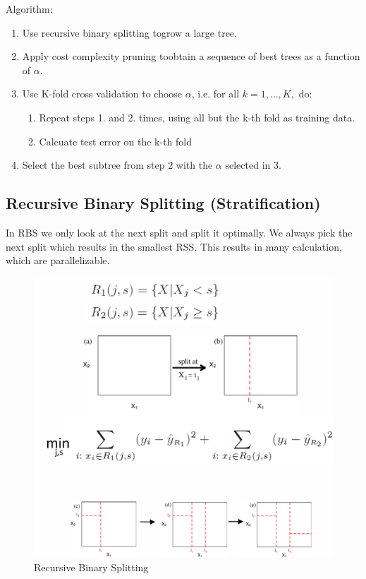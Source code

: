 \documentclass[../Main.tex]{subfiles}
\begin{document}
Algorithm:
\begin{enumerate}
    \item Use recursive binary splitting togrow a large tree.
    \item Apply cost complexity pruning toobtain a sequence of best trees as a function of \(\alpha\).
    \item Use K-fold cross validation to choose \(\alpha\), i.e. for all \(k=1,\dots,K,\) do:
    \begin{enumerate}
        \item Repeat steps 1. and 2. times, using all but the k-th fold as training data.
        \item Calcuate test error on the k-th fold
    \end{enumerate}
    \item Select the best subtree from step 2 with the \(\alpha\) selected in 3.
\end{enumerate}

\subsection{Recursive Binary Splitting (Stratification)}


In RBS we only look at the next split and split it optimally.
We always pick the next split which results in the smallest RSS.
This results in many calculation, which are parallelizable.
\begin{figure}[H]
    \centering
    \includegraphics[width=0.5\linewidth]{Images/recursive-binary-splitting.png}
    \caption{Recursive Binary Splitting}
\end{figure}
\end{document}
